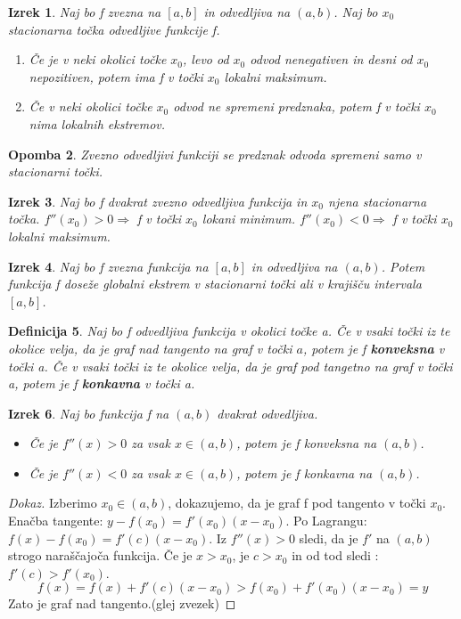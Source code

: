 \documentclass[11pt]{article}
\newtheorem{Izrek}{{\sc Izrek}}[section]
\newtheorem{Definicija}[Izrek]{{\sc Definicija}}
\newtheorem{Opomba}[Izrek]{{\sc Opomba}}
\newenvironment{dokaz}[1][{\sc Dokaz}]{\begin{proof}[#1]\renewcommand*{\qedsymbol}{\(\blacksquare\)}}{\end{proof}}
\begin{document}
\begin{Izrek}
	Naj bo f zvezna na $[a,b]$ in odvedljiva na $(a,b)$. Naj bo $x_0$ stacionarna točka odvedljive funkcije f.
	\begin{enumerate}
		\item
		Če je v neki okolici točke $x_0$, levo od $x_0$ odvod nenegativen in desni od $x_0$ nepozitiven, potem ima f v točki $x_0$ lokalni maksimum.
		\item
		Če v neki okolici točke $x_0$ odvod ne spremeni predznaka, potem f v točki $x_0$ nima lokalnih ekstremov.
	\end{enumerate}
\end{Izrek}
\begin{Opomba}
	Zvezno odvedljivi funkciji se predznak odvoda spremeni samo v stacionarni točki.
\end{Opomba}
\begin{Izrek}
	Naj bo f dvakrat zvezno odvedljiva funkcija in $x_0$ njena stacionarna točka.
	\newline
	$f''(x_0) > 0 \Rightarrow$ f v točki  $x_0$  lokani minimum.
	\newline
	$f''(x_0) < 0 \Rightarrow $ f v točki $x_0$ lokalni maksimum.
\end{Izrek}
\begin{Izrek}
	Naj bo f zvezna funkcija na $[a,b]$ in odvedljiva na $(a,b)$. Potem funkcija f doseže globalni ekstrem v stacionarni točki ali v krajišču intervala $[a,b]$.
\end{Izrek}
\begin{Definicija}
	Naj bo f odvedljiva funkcija v okolici točke a. Če v vsaki točki iz te okolice velja, da je graf nad tangento na graf v točki $a$, potem je f \textbf{konveksna} v točki a.
	\newline
	Če v vsaki točki iz te okolice velja, da je graf pod tangetno na graf v točki a, potem je f \textbf{konkavna} v točki a.
\end{Definicija}
\begin{Izrek}
	Naj bo funkcija f na $(a,b)$ dvakrat odvedljiva.
	\begin{itemize}
		\item
		Če je $f''(x) > 0$ za vsak $x \in (a,b)$, potem je f konveksna na $(a,b)$.
		\item
		Če je $f''(x) < 0$ za vsak $x\in (a,b)$, potem je f konkavna na $(a,b)$.
	\end{itemize}
\end{Izrek}
\begin{dokaz}
	Izberimo $x_0 \in (a,b)$, dokazujemo, da je graf f pod tangento v točki $x_0$. Enačba tangente: $y -f(x_0) = f'(x_0)(x-x_0)$.
	\newline
	Po Lagrangu: $f(x) - f(x_0) = f'(c) (x - x_0)$. Iz $f''(x) > 0$ sledi, da je $f'$ na $(a,b)$ strogo naraščajoča funkcija. Če je $x > x_0$, je $c > x_0$ in od tod sledi : $f'(c) > f'(x_0)$.
	$$f(x) = f(x) + f'(c) (x -x_0) > f(x_0)+ f'(x_0)(x - x_0) = y$$
	Zato je graf nad tangento.(glej zvezek)
\end{dokaz}
\end{document}
